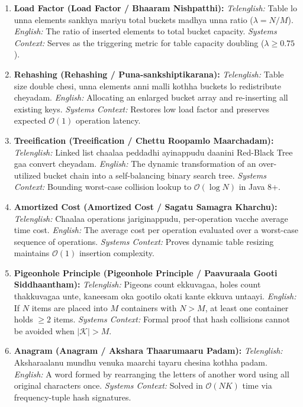\documentclass[10pt,twocolumn,letterpaper]{article}
\begin{document}
\begin{enumerate}
    \item \textbf{Load Factor (Load Factor / Bhaaram Nishpatthi):}
    \textit{Telenglish:} Table lo unna elements sankhya mariyu total buckets madhya unna ratio ($\lambda = N/M$).
    \textit{English:} The ratio of inserted elements to total bucket capacity.
    \textit{Systems Context:} Serves as the triggering metric for table capacity doubling ($\lambda \ge 0.75$).

    \item \textbf{Rehashing (Rehashing / Puna-sankshiptikarana):}
    \textit{Telenglish:} Table size double chesi, unna elements anni malli kothha buckets lo redistribute cheyadam.
    \textit{English:} Allocating an enlarged bucket array and re-inserting all existing keys.
    \textit{Systems Context:} Restores low load factor and preserves expected $\mathcal{O}(1)$ operation latency.

    \item \textbf{Treeification (Treeification / Chettu Roopamlo Maarchadam):}
    \textit{Telenglish:} Linked list chaalaa peddadhi ayinappudu daanini Red-Black Tree gaa convert cheyadam.
    \textit{English:} The dynamic transformation of an over-utilized bucket chain into a self-balancing binary search tree.
    \textit{Systems Context:} Bounding worst-case collision lookup to $\mathcal{O}(\log N)$ in Java 8+.

    \item \textbf{Amortized Cost (Amortized Cost / Sagatu Samagra Kharchu):}
    \textit{Telenglish:} Chaalaa operations jariginappudu, per-operation vacche average time cost.
    \textit{English:} The average cost per operation evaluated over a worst-case sequence of operations.
    \textit{Systems Context:} Proves dynamic table resizing maintains $\mathcal{O}(1)$ insertion complexity.

    \item \textbf{Pigeonhole Principle (Pigeonhole Principle / Paavuraala Gooti Siddhaantham):}
    \textit{Telenglish:} Pigeons count ekkuvagaa, holes count thakkuvagaa unte, kaneesam oka gootilo okati kante ekkuva untaayi.
    \textit{English:} If $N$ items are placed into $M$ containers with $N > M$, at least one container holds $\ge 2$ items.
    \textit{Systems Context:} Formal proof that hash collisions cannot be avoided when $|\mathcal{K}| > M$.

    \item \textbf{Anagram (Anagram / Akshara Thaarumaaru Padam):}
    \textit{Telenglish:} Aksharaalanu mundhu venuka maarchi tayaru chesina kothha padam.
    \textit{English:} A word formed by rearranging the letters of another word using all original characters once.
    \textit{Systems Context:} Solved in $\mathcal{O}(NK)$ time via frequency-tuple hash signatures.
\end{enumerate}
\end{document}
